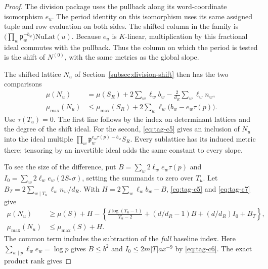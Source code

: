 \begin{proof}
The division package uses the pullback along its word-coordinate
isomorphism \(e_u\). The period identity on this isomorphism
uses its same assigned tuple and row evaluation on both
sides. The shifted column in the family is
\(\bigl(\prod_w\mathfrak p_w^{-b_w}\bigr)\mathrm{NuLat}(u)\).
Because \(e_u\) is \(K\)-linear, multiplication by this
fractional ideal commutes with the pullback. Thus the
column on which the period is tested is the shift of
\(N^{(0)}\), with the same metrics as the global slope.
\label{cor:column-orbit-length-1}


The shifted lattice \(N_u\) of Section~\ref{subsec:division-shift}
then has the two comparisons
\[
 \begin{split}
 \mu(N_u)&=\mu(S_R)+2\sum_w\ell_w b_w-
                           \frac{2}{d_R}\sum_w\ell_w n_w,\\
 \mu_{\max}(N_u)&\le\mu_{\max}(S_R)
                     +2\sum_w\ell_w\bigl(b_w-e_w\tau(p)\bigr).
 \end{split}                                                     \tag{C7}\label{eq:tag-c7}
\]
Use \(\tau(T_u)=0\). The first line follows by the index on determinant
lattices and the degree of the shift ideal. For the second,
\eqref{eq:tag-c5} gives an inclusion of \(N_u\) into the ideal multiple
\(\prod_w\mathfrak p_w^{e_w\tau(p)-b_w}S_R\).
Every sublattice has its induced metric there; tensoring by an
invertible ideal adds the same constant to every slope.


To see the size of the difference, put \(B=\sum_w2\ell_we_w\tau(p)\)
and \(I_0=\sum_w2\ell_we_w(2S_*\sigma)\), setting the summands to zero
over \(T_u\). Let \(B_T=2\sum_{w\mid T_u}\ell_wn_w/d_R\).
With \(H=2\sum_w\ell_w b_w-B\), \eqref{eq:tag-c5} and \eqref{eq:tag-c7} give
\[
 \begin{split}
 \mu(N_u)&\ge\mu(S)+H-
  \left\{ \frac{f\log(T_u-1)}{T_u-2}
       +(d/d_R-1)B+(d/d_R)I_0+B_T\right\},\\
 \mu_{\max}(N_u)&\le\mu_{\max}(S)+H.
 \end{split}                                                     \tag{C8}\label{eq:tag-c8}
\]
The common term includes the subtraction of the \emph{full} baseline
index. Here \(\sum_{w\mid p}\ell_w e_w=\log p\) gives \(B\le b^2\)
and \(I_0\le2m|T|a x^{-9}\) by \eqref{eq:tag-c6}. The exact product rank gives


\end{proof}
